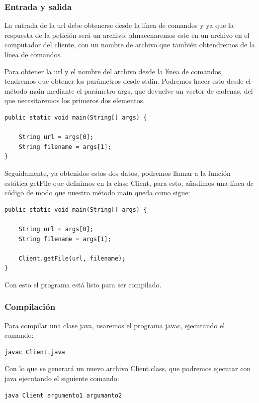 \documentclass[11pt]{article}
\begin{document}
\subsubsection{Entrada y salida}
\label{sec:orgae0c6dc}
La entrada de la url debe obtenerse desde la línea de comandos
y ya que la respuesta de la petición será un archivo,
almacenaremos este en un archivo en el computador del cliente,
con un nombre de archivo que también obtendremos de la línea de comandos.

Para obtener la url y el nombre del archivo desde la línea de comandos,
tendremos que obtener los parámetros desde stdin.
Podremos hacer esto desde el método main mediante el parámetro args,
que devuelve un vector de cadenas, del que necesitaremos los primeros dos elementos.

\begin{verbatim}
public static void main(String[] args) {

    String url = args[0];
    String filename = args[1];
}
\end{verbatim}

Seguidamente, ya obtenidos estos dos datos,
podremos llamar a la función estática getFile que definimos en la clase Client,
para esto, añadimos una línea de código de modo que nuestro método main queda como sigue:

\begin{verbatim}
public static void main(String[] args) {

    String url = args[0];
    String filename = args[1];

    Client.getFile(url, filename);
}
\end{verbatim}

Con esto el programa está listo para ser compilado.

\subsubsection{Compilación}
\label{sec:org51b06e4}
Para compilar una clase java, usaremos el programa javac,
ejecutando el comando:

\begin{verbatim}
javac Client.java
\end{verbatim}

Con lo que se generará un nuevo archivo Client.class,
que podremos ejecutar con java ejecutando el siguiente comando:

\begin{verbatim}
java Client argumento1 argumanto2
\end{verbatim}
\end{document}

